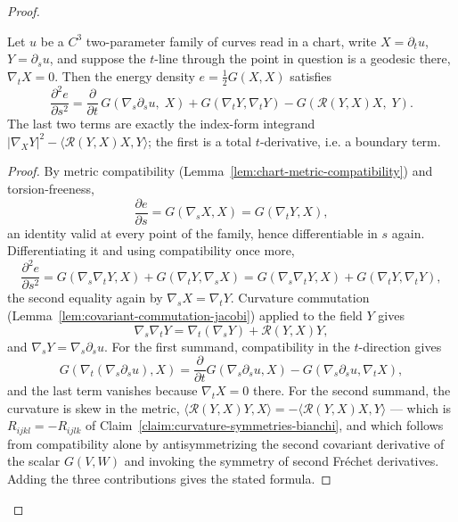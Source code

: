\begin{proof}
\begin{lemma}
\label{lem:second-variation-energy-chart}
\leanok
Let $u$ be a $C^3$ two-parameter family of curves read in a chart, write
$X=\partial_t u$, $Y=\partial_s u$, and suppose the $t$-line through the point in
question is a geodesic there, $\nabla_tX=0$.  Then the energy density
$e=\tfrac12 G(X,X)$ satisfies
$$\frac{\partial^2 e}{\partial s^2}
=\frac{\partial}{\partial t}\,G\!\left(\nabla_s\partial_s u,\;X\right)
+G(\nabla_tY,\nabla_tY)-G\!\left({\mathcal R}(Y,X)X,\;Y\right).$$
The last two terms are exactly the index-form integrand $|\nabla_XY|^2-\langle
{\mathcal R}(Y,X)X,Y\rangle$; the first is a total $t$-derivative, i.e. a boundary
term.
\end{lemma}

\begin{proof}
\leanok
By metric compatibility (Lemma~\ref{lem:chart-metric-compatibility}) and
torsion-freeness,
$$\frac{\partial e}{\partial s}=G(\nabla_sX,X)=G(\nabla_tY,X),$$
an identity valid at every point of the family, hence differentiable in $s$ again.
Differentiating it and using compatibility once more,
$$\frac{\partial^2e}{\partial s^2}
=G(\nabla_s\nabla_tY,X)+G(\nabla_tY,\nabla_sX)
=G(\nabla_s\nabla_tY,X)+G(\nabla_tY,\nabla_tY),$$
the second equality again by $\nabla_sX=\nabla_tY$.  Curvature commutation
(Lemma~\ref{lem:covariant-commutation-jacobi}) applied to the field $Y$ gives
$$\nabla_s\nabla_tY=\nabla_t\left(\nabla_sY\right)+{\mathcal R}(Y,X)Y,$$
and $\nabla_sY=\nabla_s\partial_su$.  For the first summand, compatibility in the
$t$-direction gives
$$G\!\left(\nabla_t(\nabla_s\partial_su),X\right)
=\frac{\partial}{\partial t}G\!\left(\nabla_s\partial_su,X\right)
-G\!\left(\nabla_s\partial_su,\nabla_tX\right),$$
and the last term vanishes because $\nabla_tX=0$ there.  For the second summand,
the curvature is skew in the metric,
$\langle{\mathcal R}(Y,X)Y,X\rangle=-\langle{\mathcal R}(Y,X)X,Y\rangle$ — which is
$R_{ijkl}=-R_{ijlk}$ of
Claim~\ref{claim:curvature-symmetries-bianchi}, and which follows from
compatibility alone by antisymmetrizing the second covariant derivative of the
scalar $G(V,W)$ and invoking the symmetry of second Fréchet derivatives.  Adding
the three contributions gives the stated formula.
\end{proof}


\end{proof}
